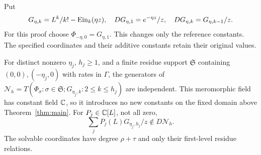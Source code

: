 Put
\begin{equation}\label{eq:core-G}
G_{\eta,k}=L^k/k!-\operatorname{Ein}_k(\eta z),\quad
DG_{\eta,1}=e^{-\eta z}/z,\quad DG_{\eta,k}=G_{\eta,k-1}/z.
\end{equation}
For this proof choose $\Phi_{-\eta,0}=G_{\eta,1}$.
This changes only the reference constants. The specified coordinates
and their additive constants retain their original values.
\begin{lemma}\label{lem:tower}
For distinct nonzero $\eta_j$, $h_j\ge1$, and a finite residue support
$\mathfrak S$ containing $(0,0),(-\eta_j,0)$ with rates in $\Gamma$, the
generators of
$\mathcal N_h=T(\Phi_\sigma:\sigma\in\mathfrak S;
G_{\eta_j,k}:2\le k\le h_j)$ are independent. This meromorphic field
has constant field $\mathbb{C}$, so it introduces no new constants on the fixed
domain above Theorem~\ref{thm:main}. For $P_j\in\mathbb{C}[L]$, not all
zero,
\begin{equation}\label{eq:core-NP}
\sum_jP_j(L)G_{\eta_j,h_j}/z\notin D\mathcal N_h.
\end{equation}
The solvable coordinates have degree $\rho+\tau$ and only their first-level
residue relations.
\end{lemma}
